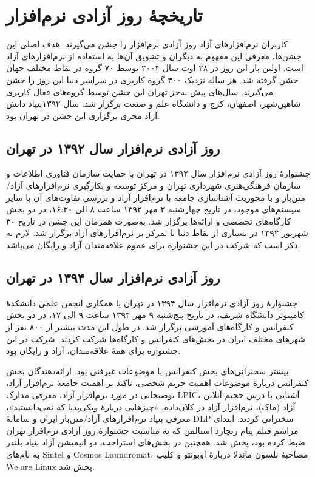 \documentclass{article}
\begin{document}
\section{تاریخچهٔ روز آزادی نرم‌افزار}
کاربران نرم‌افزارهای آزاد روز آزادی نرم‌افزار را جشن می‌گیرند. هدف اصلی این جشن‌ها، معرفی این مفهوم به دیگران و تشویق آن‌ها به استفاده از نرم‌افزارهای آزاد است.
اولین بار این روز در ۲۸ اوت سال ۲۰۰۴ توسط ۷۰ گروه در نقاط مختلف جهان جشن گرفته شد. هر ساله نزدیک ۳۰۰ گروه کاربری در سراسر دنیا این روز را جشن می‌گیرند. سال‌های پیش به‌جز تهران این جشن توسط گروه‌های فعال کاربری شاهین‌شهر، اصفهان، کرج و دانشگاه علم و صنعت برگزار شد. سال ۱۳۹۲بنیاد دانش آزاد مجری برگزاری این جشن در تهران بود.
\subsection{روز آزادی نرم‌افزار سال ۱۳۹۲ در تهران}
جشنوارهٔ روز آزادی نرم‌افزار سال ۱۳۹۲ در تهران با حمایت سازمان فناوری اطلاعات و سازمان فرهنگی‌هنری شهرداری تهران و مرکز توسعه و بکارگیری نرم‌افزارهای آزاد/متن‌باز و با محوریت آشناسازی جامعه با نرم‌افزار آزاد و بررسی تفاوت‌های آن با سایر سیستم‌های موجود، در تاریخ چهارشنبه ۳ مهر ۱۳۹۲ ساعت ۸ الی ۱۶:۳۰، در دو بخش کارگاه‌های تخصصی و ارائه‌ها برگزار شد. به‌صورت همزمان این جشن در تاریخ ۳۰ شهریور ۱۳۹۲  در بسیاری از نقاط دنیا با تمرکز بر نرم‌افزارهای آزاد برگزار شد. لازم به ذکر است که شرکت در این جشنواره برای عموم علاقه‌مندان آزاد و رایگان می‌باشد.

\subsection{روز آزادی نرم‌افزار سال ۱۳۹۴ در تهران}
جشنوارهٔ روز آزادی نرم‌افزار سال ۱۳۹۴ در تهران با همکاری انجمن علمی دانشکدهٔ کامپیوتر دانشگاه شریف، در تاریخ پنج‌شنبه ۹ مهر ۱۳۹۴ ساعت ۹ الی ۱۷، در دو بخش کنفرانس و کارگاه‌های آموزشی برگزار شد. در طول این مدت بیشتر از ۸۰۰ نفر از شهرهای مختلف ایران در بخش‌های کنفرانس و کارگاه‌ها شرکت کردند. شرکت در این جشنواره برای همهٔ علاقه‌مندان، آزاد و رایگان بود.

بیشتر سخنرانی‌های بخش کنفرانس با موضوعات غیرفنی بود. ارائه‌دهندگان بخش کنفرانس دربارهٔ موضوعات اهمیت حریم شخصی، تاکید بر اهمیت جامعهٔ نرم‌افزار آزاد، توضیحاتی در مورد نرم‌افزار آزاد، معرفی مدارک LPIC، آشنایی با درس حجیم آنلاین آزاد (ماک)، نرم‌افزار آزاد در کلان‌داده، «چیزهایی دربارهٔ ویکی‌پدیا که نمی‌دانستید»، معرفی بنیاد نرم‌افزارهای آزاد/متن‌باز ایران و سامانهٔ DLP سخنرانی کردند. ابتدای مراسم فیلم پیام ریچارد استالمن که به مناسبت جشنوارهٔ روز آزادی نرم‌افزار تهران ضبط کرده بود، پخش شد. همچنین در بخش‌‌های استراحت، دو انیمیشن آزاد بنیاد بلندر به نام‌های Sintel و Cosmos Laundromat، مصاحبهٔ نلسون ماندلا دربارهٔ اوبونتو و کلیپ We are Linux پخش شد.
\end{document}

